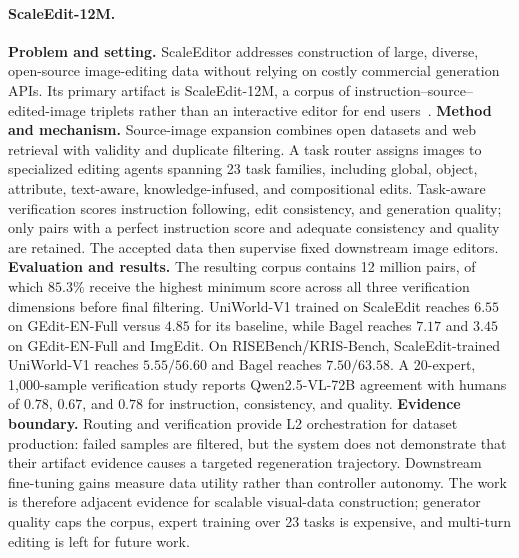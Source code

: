 \paragraph{ScaleEdit-12M.}
\textbf{Problem and setting.} ScaleEditor addresses construction of large, diverse, open-source image-editing data without relying on costly commercial generation APIs. Its primary artifact is ScaleEdit-12M, a corpus of instruction--source--edited-image triplets rather than an interactive editor for end users~\cite{avg260320644}. \textbf{Method and mechanism.} Source-image expansion combines open datasets and web retrieval with validity and duplicate filtering. A task router assigns images to specialized editing agents spanning 23 task families, including global, object, attribute, text-aware, knowledge-infused, and compositional edits. Task-aware verification scores instruction following, edit consistency, and generation quality; only pairs with a perfect instruction score and adequate consistency and quality are retained. The accepted data then supervise fixed downstream image editors. \textbf{Evaluation and results.} The resulting corpus contains 12 million pairs, of which $85.3\%$ receive the highest minimum score across all three verification dimensions before final filtering. UniWorld-V1 trained on ScaleEdit reaches $6.55$ on GEdit-EN-Full versus $4.85$ for its baseline, while Bagel reaches $7.17$ and $3.45$ on GEdit-EN-Full and ImgEdit. On RISEBench/KRIS-Bench, ScaleEdit-trained UniWorld-V1 reaches $5.55/56.60$ and Bagel reaches $7.50/63.58$. A 20-expert, 1,000-sample verification study reports Qwen2.5-VL-72B agreement with humans of $0.78$, $0.67$, and $0.78$ for instruction, consistency, and quality. \textbf{Evidence boundary.} Routing and verification provide L2 orchestration for dataset production: failed samples are filtered, but the system does not demonstrate that their artifact evidence causes a targeted regeneration trajectory. Downstream fine-tuning gains measure data utility rather than controller autonomy. The work is therefore adjacent evidence for scalable visual-data construction; generator quality caps the corpus, expert training over 23 tasks is expensive, and multi-turn editing is left for future work.



